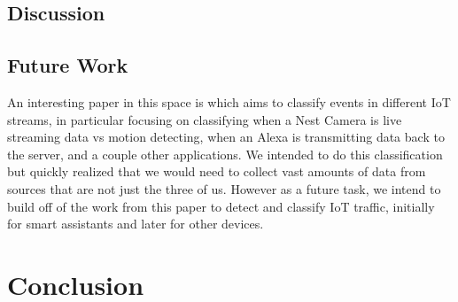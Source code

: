\documentclass[letterpaper,twocolumn,10pt]{article}
\begin{document}
\subsection{Discussion}

\subsection{Future Work}

An interesting paper in this space is \cite{DBLP:journals/corr/ApthorpeRF17} which aims to classify events in different IoT streams, in particular focusing on classifying when a Nest Camera is live streaming data vs motion detecting, when an Alexa is transmitting data back to the server, and a couple other applications. We intended to do this classification but quickly realized that we would need to collect vast amounts of data from sources that are not just the three of us. However as a future task, we intend to build off of the work from this paper to detect and classify IoT traffic, initially for smart assistants and later for other devices. 

\section{Conclusion}




\end{document}
